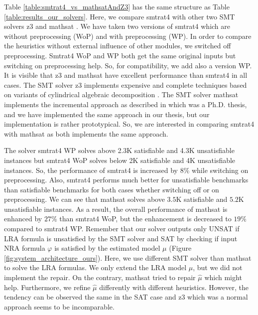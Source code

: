 \noindent Table \ref{table:smtrat4_vs_mathsatAndZ3} has the same structure as Table \ref{table:results_our_solvers}.
Here, we compare smtrat4 with other two SMT solvers z3 \cite{10.1007/978-3-540-78800-3_24} and mathsat \cite{ 10.1007/978-3-642-36742-7_7}.
We have taken two versions of smtrat4 which are without preprocessing (WoP) and with preprocessing (WP).
In order to compare the heuristics without external influence of other modules, we switched off preprocessing.
Smtrat4 WoP and WP both get the same original inputs but switching on preprocessing help.
So, for compatibility, we add also a version WP.
It is visible that z3 and mathsat have excellent performance than smtrat4 in all cases.
The SMT solver z3 implements expensive and complete techniques based on variants of cylindrical algebraic decomposition \cite{Cimatti:2018:ILS:3274693.3230639}.
The SMT solver mathsat implements the incremental approach as described in \cite{irfan2018incremental} which was a Ph.D. thesis, and we have implemented the same approach in our thesis, but our implementation is rather prototypical.
So, we are interested in comparing smtrat4 with mathsat as both implements the same approach.\newline

\noindent The solver smtrat4 WP solves above 2.3K satisfiable and 4.3K unsatisfiable instances but smtrat4 WoP solves below 2K satisfiable and 4K unsatisfiable instances.
So, the performance of smtrat4 is increased by $8\%$ while switching on preprocessing.
Also, smtrat4 performs much better for unsatisfiable benchmarks than satisfiable benchmarks for both cases whether switching off or on preprocessing.
We can see that mathsat solves above $3.5$K satisfiable and $5.2$K unsatisfiable instances.
As a result, the overall performance of mathsat is enhanced by $27\%$ than smtrat4 WoP, but the enhancement is decreased to $19\%$ compared to smtrat4 WP.
Remember that our solver outputs only UNSAT if LRA formula is unsatisfied by the SMT solver and SAT by checking if input NRA formula $\varphi$ is satisfied by the estimated model $\mu$ (Figure \ref{fig:system_architecture_ours}).
Here, we use different SMT solver than mathsat to solve the LRA formulas.
We only extend the LRA model $\hat{\mu}$, but we did not implement the repair.
On the contrary, mathsat tried to repair $\hat{\mu}$ which might help.
Furthermore, we refine $\hat{\mu}$ differently with different heuristics.
However, the tendency can be observed the same in the SAT case and z3 which was a normal approach seems to be incomparable.\newline


